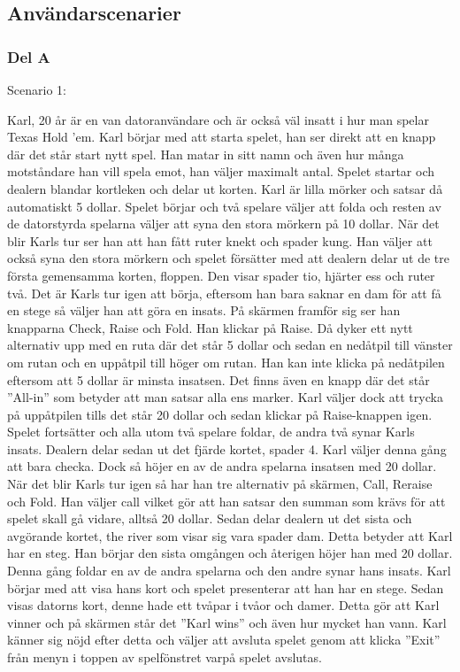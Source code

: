 \documentclass[10pt,a4paper]{article}
\begin{document}
\subsection*{Användarscenarier}

\subsubsection*{Del A}

Scenario 1:

\vspace{1em}
\noindent
Karl, 20 år är en van datoranvändare och är också väl insatt i hur man
spelar Texas Hold ’em. Karl börjar med att starta spelet, han ser direkt
att en knapp där det står start nytt spel. Han matar in sitt namn och även
hur många motståndare han vill spela emot, han väljer maximalt antal.
Spelet startar och dealern blandar kortleken och delar ut korten. Karl är
lilla mörker och satsar då automatiskt 5 dollar. Spelet börjar och två
spelare väljer att folda och resten av de datorstyrda spelarna väljer att
syna den stora mörkern på 10 dollar. När det blir Karls tur ser han att han
fått ruter knekt och spader kung. Han väljer att också syna den stora
mörkern och spelet försätter med att dealern delar ut de tre första
gemensamma korten, floppen. Den visar spader tio, hjärter ess och ruter
två. Det är Karls tur igen att börja, eftersom han bara saknar en dam för
att få en stege så väljer han att göra en insats. På skärmen framför sig
ser han knapparna Check, Raise och Fold. Han klickar på Raise. Då dyker ett
nytt alternativ upp med en ruta där det står 5 dollar och sedan en nedåtpil
till vänster om rutan och en uppåtpil till höger om rutan. Han kan inte
klicka på nedåtpilen eftersom att 5 dollar är minsta insatsen. Det finns
även en knapp där det står ”All-in” som betyder att man satsar alla ens
marker. Karl väljer dock att trycka på uppåtpilen tills det står 20 dollar
och sedan klickar på Raise-knappen igen. Spelet fortsätter och alla utom
två spelare foldar, de andra två synar Karls insats. Dealern delar sedan ut
det fjärde kortet, spader 4. Karl väljer denna gång att bara checka. Dock
så höjer en av de andra spelarna insatsen med 20 dollar. När det blir Karls
tur igen så har han tre alternativ på skärmen, Call, Reraise och Fold. Han
väljer call vilket gör att han satsar den summan som krävs för att spelet
skall gå vidare, alltså 20 dollar. Sedan delar dealern ut det sista och
avgörande kortet, the river som visar sig vara spader dam. Detta betyder
att Karl har en steg. Han börjar den sista omgången och återigen höjer han
med 20 dollar. Denna gång foldar en av de andra spelarna och den andre
synar hans insats. Karl börjar med att visa hans kort och spelet
presenterar att han har en stege. Sedan visas datorns kort, denne hade ett
tvåpar i tvåor och damer. Detta gör att Karl vinner och på skärmen står det
”Karl wins” och även hur mycket han vann. Karl känner sig nöjd efter detta
och väljer att avsluta spelet genom att klicka ”Exit” från menyn i toppen
av spelfönstret varpå spelet avslutas.
\end{document}
